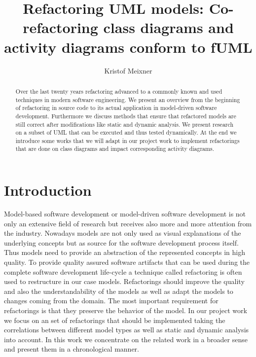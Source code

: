 \documentclass{llncs}
\begin{document}
\pagestyle{plain}

\title{Refactoring UML models: Co-refactoring class diagrams and activity diagrams conform to fUML}
\author{Kristof Meixner}

\maketitle

\begin{abstract} Over the last twenty years refactoring advanced to a commonly known and used techniques in modern
software engineering. We present an overview from the beginning of refactoring in source code to its actual application
in model-driven software development. Furthermore we discuss methods that ensure that refactored models are still
correct after modifications like static and dynamic analysis. We present research on a subset of UML that can be
executed and thus tested dynamically. At the end we introduce some works that we will adapt in our project work to
implement refactorings that are done on class diagrams and impact corresponding activity diagrams.
\end{abstract}


\tableofcontents
\newpage


\section{Introduction}
\label{sec:intro}

Model-based software development or model-driven software development is not only an extensive field of research but
receives also more and more attention from the industry. Nowadays models are not only used as visual explanations of
the underlying concepts but as source for the software development process itself. Thus models need to provide an abstraction of the
represented concepts in high quality. To provide quality assured software artifacts that can be used during the complete software development
life-cycle a technique called refactoring is often used to restructure in our case models. Refactorings should improve
the quality and also the understandability of the models as well as adapt the models to changes coming from the
domain. The most important requirement for refactorings is that they preserve the behavior of the model. In our project
work we focus on an set of refactorings that should be implemented taking the correlations between different model types
as well as static and dynamic analysis into account. In this work we concentrate on the related work in a broader sense
and present them in a chronological manner.
\end{document}
